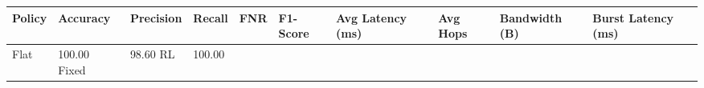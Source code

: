 \begin{tabular}{llllllllll}
\toprule
Policy & Accuracy & Precision & Recall & FNR & F1-Score & Avg Latency (ms) & Avg Hops & Bandwidth (B) & Burst Latency (ms) \\
\midrule
Flat & 100.00%
Fixed & 98.60%
RL & 100.00%
\bottomrule
\end{tabular}
